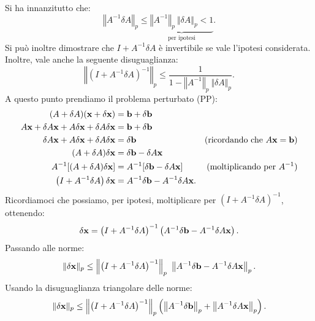 Si ha innanzitutto che:
\begin{equation*}
\left\Vert A^{-1} \delta A\right\Vert _{p} \leqslant \underbrace{\left\Vert A^{-1}\right\Vert _{p} \ \Vert \delta A\Vert _{p} < 1}_{\text{per ipotesi}}.
\end{equation*}
Si può inoltre dimostrare che $\displaystyle I+A^{-1} \delta A$ è invertibile se vale l'ipotesi considerata. Inoltre, vale anche la seguente disuguaglianza:
\begin{equation}
\left\Vert \left( I+A^{-1} \delta A\right)^{-1}\right\Vert _{p} \leqslant \frac{1}{1-\left\Vert A^{-1}\right\Vert _{p} \ \Vert \delta A\Vert _{p}}.
\label{eq:dis-in-teo-stab}
\end{equation}
A questo punto prendiamo il problema perturbato (PP):
\begin{align*}
( A+\delta A)(\mathbf{x} +\delta \mathbf{x}) & =\mathbf{b} +\delta \mathbf{b} & \\
A\mathbf{x} +\delta A\mathbf{x} +A\delta \mathbf{x} +\delta A\delta \mathbf{x} & =\mathbf{b} +\delta \mathbf{b} & \\
\delta A\mathbf{x} +A\delta \mathbf{x} +\delta A\delta \mathbf{x} & =\delta \mathbf{b} & \text{(ricordando che $A\mathbf{x} =\mathbf{b}$)}\\
( A+\delta A) \delta \mathbf{x} & =\delta \mathbf{b} -\delta A\mathbf{x} & \\
A^{-1}[( A+\delta A) \delta \mathbf{x}] & =A^{-1}[ \delta \mathbf{b} -\delta A\mathbf{x}] & \text{(moltiplicando per $A^{-1}$)}\\
\left( I+A^{-1} \delta A\right) \delta \mathbf{x} & =A^{-1} \delta \mathbf{b} -A^{-1} \delta A\mathbf{x}. &
\end{align*}
Ricordiamoci che possiamo, per ipotesi, moltiplicare per $\left( I+A^{-1} \delta A\right)^{-1}$, ottenendo:
\begin{equation*}
\delta \mathbf{x} =\left( I+A^{-1} \delta A\right)^{-1}\left( A^{-1} \delta \mathbf{b} -A^{-1} \delta A\mathbf{x}\right).
\end{equation*}
Passando alle norme:
\begin{equation*}
\Vert \delta \mathbf{x}\Vert _{p} \leq \left\Vert \left( I+A^{-1} \delta A\right)^{-1}\right\Vert _{p} \ \left\Vert A^{-1} \delta \mathbf{b} -A^{-1} \delta A\mathbf{x}\right\Vert _{p}.
\end{equation*}
Usando la disuguaglianza triangolare delle norme: %
\begin{equation*}
\Vert \delta \mathbf{x}\Vert _{p} \leq \left\Vert \left( I+A^{-1} \delta A\right)^{-1}\right\Vert _{p}\left(\left\Vert A^{-1} \delta \mathbf{b}\right\Vert _{p} +\left\Vert A^{-1} \delta A\mathbf{x}\right\Vert _{p}\right).
\end{equation*}
